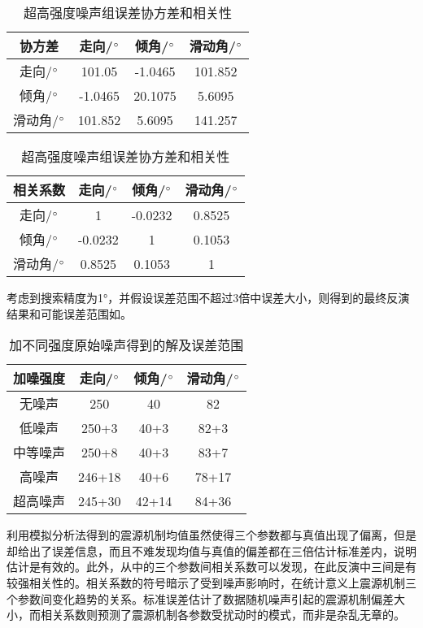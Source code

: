 \begin{table}[ht]
\centering
\caption{超高强度噪声组误差协方差和相关性}
\label{tab3_05}
    \begin{tabular}{c c c c}
    \hline
    协方差 & 走向/$^\circ$ & 倾角/$^\circ$ & 滑动角/$^\circ$ \\
    \hline
	走向/$^\circ$ 		&101.05 	&-1.0465	&101.852\\
	倾角/$^\circ$		&-1.0465	&20.1075	&5.6095\\
	滑动角/$^\circ$	&101.852	&5.6095		&141.257\\
    \hline
    \end{tabular}
    \begin{tabular}{c c c c}
    \hline
    相关系数 & 走向/$^\circ$ & 倾角/$^\circ$ & 滑动角/$^\circ$ \\
    \hline
	走向/$^\circ$ 		&1 			&-0.0232	&0.8525\\
	倾角/$^\circ$		&-0.0232	&1			&0.1053\\
	滑动角/$^\circ$	&0.8525		&0.1053		&1\\
    \hline
    \end{tabular}
\end{table}
考虑到搜索精度为1°，并假设误差范围不超过3倍中误差大小，则得到的最终反演结果和可能误差范围如。
\begin{table}[ht]
\centering
\caption{加不同强度原始噪声得到的解及误差范围}
\label{tab3_06}
    \begin{tabular}{c c c c}
    \hline
    加噪强度 & 走向/$^\circ$ & 倾角/$^\circ$ & 滑动角/$^\circ$ \\
    \hline
    无噪声		& 250 & 40 & 82  \\
    低噪声		& 250+3 & 40+3 & 82+3  \\
    中等噪声	& 250+8 & 40+3 & 83+7  \\
    高噪声		& 246+18 & 40+6 & 78+17  \\
    超高噪声	& 245+30 & 42+14 & 84+36  \\
    \hline
    \end{tabular}
\end{table}

利用模拟分析法得到的震源机制均值虽然使得三个参数都与真值出现了偏离，但是却给出了误差信息，而且不难发现均值与真值的偏差都在三倍估计标准差内，说明估计是有效的。此外，从中的三个参数间相关系数可以发现，在此反演中三间是有较强相关性的。相关系数的符号暗示了受到噪声影响时，在统计意义上震源机制三个参数间变化趋势的关系。标准误差估计了数据随机噪声引起的震源机制偏差大小，而相关系数则预测了震源机制各参数受扰动时的模式，而非是杂乱无章的。

